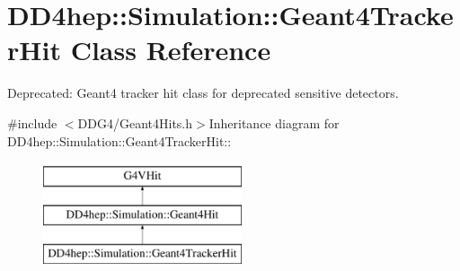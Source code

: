 \hypertarget{class_d_d4hep_1_1_simulation_1_1_geant4_tracker_hit}{
\section{DD4hep::Simulation::Geant4TrackerHit Class Reference}
\label{class_d_d4hep_1_1_simulation_1_1_geant4_tracker_hit}
}


Deprecated: Geant4 tracker hit class for deprecated sensitive detectors.  


{\ttfamily \#include $<$DDG4/Geant4Hits.h$>$}Inheritance diagram for DD4hep::Simulation::Geant4TrackerHit::\begin{figure}[H]
\begin{center}
\leavevmode
\includegraphics[height=3cm]{class_d_d4hep_1_1_simulation_1_1_geant4_tracker_hit}
\end{center}
\end{figure}
